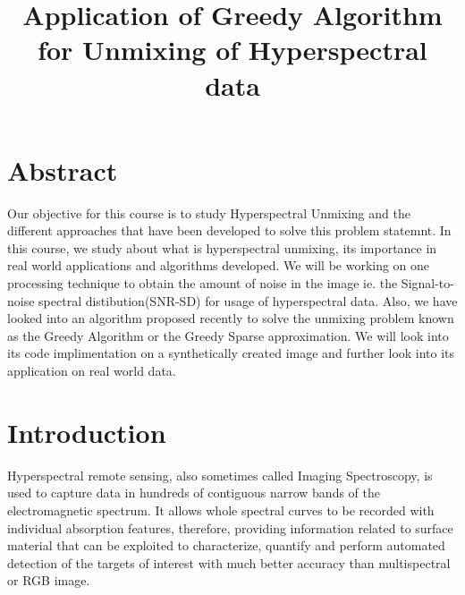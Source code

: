 \documentclass[12pt]{svproc}
\begin{document}
	


\title{Application of Greedy Algorithm for Unmixing of Hyperspectral data}

%
\author{}


\maketitle              %
%

\section{\Large Abstract}
Our objective for this course is to study Hyperspectral Unmixing and the different approaches that have been developed to solve this problem statemnt. In this course, we  study about what is hyperspectral unmixing, its importance in real world applications and algorithms developed. We will be working on one processing technique to obtain the amount of noise in the image ie. the Signal-to-noise spectral distibution(SNR-SD) for usage of hyperspectral data. Also, we have looked into an algorithm proposed recently to solve the unmixing problem known as the Greedy Algorithm or the Greedy Sparse approximation. We will look into its code implimentation on a synthetically created image and further look into its application on real world data. 


\section[60pt]{\Large Introduction}
%
Hyperspectral remote sensing, also sometimes called Imaging Spectroscopy, is used to capture data in hundreds of contiguous narrow bands of the electromagnetic spectrum. It allows whole spectral curves to be recorded with individual absorption features, therefore, providing information related to surface material that can be exploited to characterize, quantify and perform automated detection of the targets of interest with much better accuracy than multispectral or RGB image. \\
\end{document}
